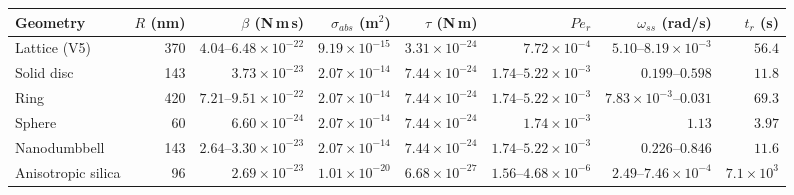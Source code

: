 \begin{tabular}{lrrrrrrr}
\hline
Geometry & $R$ (nm) & $\beta$ (N\,m\,s) & $\sigma_{abs}$ (m$^2$) & $\tau$ (N\,m) & $Pe_r$ & $\omega_{ss}$ (rad/s) & $t_{r}$ (s) \\
\hline
Lattice (V5) & 370 & $4.04$--$6.48\times10^{-22}$ & $9.19\times10^{-15}$ & $3.31\times10^{-24}$ & $7.72\times10^{-4}$ & $5.10$--$8.19\times10^{-3}$ & $56.4$ \\
Solid disc & 143 & $3.73\times10^{-23}$ & $2.07\times10^{-14}$ & $7.44\times10^{-24}$ & $1.74$--$5.22\times10^{-3}$ & $0.199$--$0.598$ & $11.8$ \\
Ring & 420 & $7.21$--$9.51\times10^{-22}$ & $2.07\times10^{-14}$ & $7.44\times10^{-24}$ & $1.74$--$5.22\times10^{-3}$ & $7.83\times10^{-3}$--$0.031$ & $69.3$ \\
Sphere & 60 & $6.60\times10^{-24}$ & $2.07\times10^{-14}$ & $7.44\times10^{-24}$ & $1.74\times10^{-3}$ & $1.13$ & $3.97$ \\
Nanodumbbell & 143 & $2.64$--$3.30\times10^{-23}$ & $2.07\times10^{-14}$ & $7.44\times10^{-24}$ & $1.74$--$5.22\times10^{-3}$ & $0.226$--$0.846$ & $11.6$ \\
Anisotropic silica & 96 & $2.69\times10^{-23}$ & $1.01\times10^{-20}$ & $6.68\times10^{-27}$ & $1.56$--$4.68\times10^{-6}$ & $2.49$--$7.46\times10^{-4}$ & $7.1\times10^{3}$ \\
\hline
\end{tabular}
